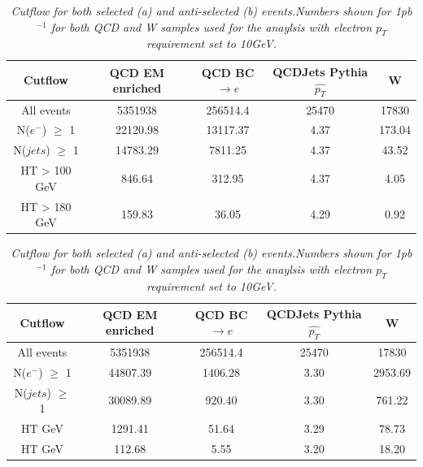 \documentclass[12pt]{article}
\begin{document}
\begin{table}[h!]
\begin{center}
\begin{tabular}{|c|c|c|c|c|}
\hline
Cutflow & QCD EM enriched & QCD BC$\rightarrow e$ & QCDJets Pythia $\hat{p_{T}}$ &  W \\
\hline
All events & 5351938 & 256514.4 & 25470 & 17830 \\
\hline
N($e^{-}$) $\geq$ 1 & 22120.98 & 13117.37 & 4.37 & 173.04\\
\hline
N($jets$) $\geq$ 1 & 14783.29 & 7811.25 & 4.37 & 43.52\\
\hline
HT > 100 GeV & 846.64 & 312.95 & 4.37 & 4.05\\
\hline
HT > 180 GeV & 159.83& 36.05 & 4.29 & 0.92\\
\hline
\end{tabular}


\begin{tabular}{|c|c|c|c|c|}
\hline
Cutflow & QCD EM enriched & QCD BC$\rightarrow e$ & QCDJets Pythia $\hat{p_{T}}$ &  W \\
\hline
All events & 5351938 & 256514.4 & 25470 & 17830\\
N($e^{-}$) $\geq$ 1 & 44807.39 & 1406.28 & 3.30 & 2953.69\\

N($jets$) $\geq$ 1 & 30089.89 & 920.40 & 3.30 & 761.22\\

HT \> 100 GeV & 1291.41 & 51.64 & 3.29 & 78.73\\

HT \> 180 GeV & 112.68 & 5.55 & 3.20 & 18.20\\

\end{tabular}
\end{center}
\caption{\textit{Cutflow for both selected (a) and anti-selected (b) events.Numbers shown for 1pb$^{-1}$ for both QCD and W samples used for the anaylsis with electron $p_{T}$ requirement set to 10GeV.}}
\label{tab:numbers10}
\end{table}
\end{document}
